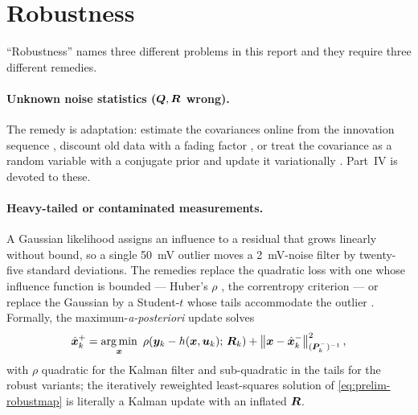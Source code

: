 \section{Robustness}
\label{sec:prelim-robust}

``Robustness'' names three different problems in this report and they require three different
remedies.

\paragraph{Unknown noise statistics ($\bm{Q},\bm{R}$ wrong).} The remedy is adaptation: estimate the
covariances online from the innovation sequence \cite{mehra1970,sagehusa1969,mohamed1999adaptive},
discount old data with a fading factor \cite{sorenson1971fading}, or treat the covariance as a
random variable with a conjugate prior and update it variationally
\cite{sarkka2009vb}. Part~IV is devoted to these.

\paragraph{Heavy-tailed or contaminated measurements.} A Gaussian likelihood assigns an
influence to a residual that grows linearly without bound, so a single \SI{50}{\milli\volt}
outlier moves a \SI{2}{\milli\volt}-noise filter by twenty-five standard deviations. The remedies
replace the quadratic loss with one whose influence function is bounded --- Huber's
$\rho$ \cite{huber1964,masreliez1975,karlgaard2007huber}, the correntropy criterion
\cite{chen2017mckf} --- or replace the Gaussian by a Student-$t$ whose tails accommodate the
outlier \cite{roth2013studentt}. Formally, the maximum-\emph{a-posteriori} update solves
\begin{equation}
\hat{\bm{x}}^{+}_k = \operatorname*{arg\,min}_{\bm{x}}\ \rho\!\left(\bm{y}_k - h(\bm{x},\bm{u}_k);\,\bm{R}_k\right)
  + \left\lVert \bm{x}-\hat{\bm{x}}^{-}_k \right\rVert^2_{(\bm{P}^{-}_k)^{-1}},
\label{eq:prelim-robustmap}
\end{equation}
with $\rho$ quadratic for the Kalman filter and sub-quadratic in the tails for the robust
variants; the iteratively reweighted least-squares solution of \eqref{eq:prelim-robustmap} is
literally a Kalman update with an inflated $\bm{R}$.

